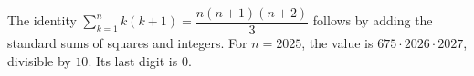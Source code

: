 The identity $\sum_{k=1}^n k(k+1)=\dfrac{n(n+1)(n+2)}{3}$ follows by adding the standard sums of squares and integers. For $n=2025$, the value is $675\cdot2026\cdot2027$, divisible by $10$. Its last digit is $\boxed0$.
